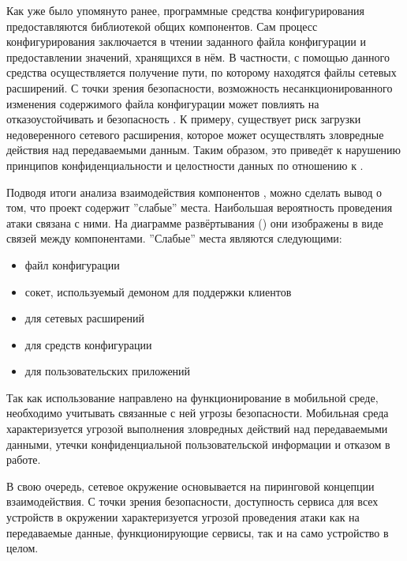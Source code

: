 %
Как уже было упомянуто ранее, программные средства конфигурирования \PeerHood предоставляются библиотекой общих компонентов. 
%
Сам процесс конфигурирования заключается в чтении заданного файла конфигурации и предоставлении значений, хранящихся в нём. 
%
В частности, с помощью данного средства осуществляется получение пути, по которому находятся файлы сетевых расширений. 
%
С точки зрения безопасности, возможность несанкционированного изменения содержимого файла конфигурации может повлиять на отказоустойчивать и безопасность \PeerHood. 
%
К примеру, существует риск загрузки недоверенного сетевого расширения, которое может осуществлять зловредные действия над передаваемыми данным.
%
Таким образом, это приведёт к нарушению принципов конфиденциальности и целостности данных по отношению к \PeerHood. 

%
Подводя итоги анализа взаимодействия компонентов \PeerHood, можно сделать вывод о том, что проект содержит ''слабые'' места. Наибольшая вероятность проведения атаки связана с ними. На диаграмме развёртывания \PeerHood () они изображены в виде связей между компонентами. ''Слабые'' места \PeerHood являются следующими:
\begin{itemize}
	\setlength{\itemsep}{0pt}%

	\item файл конфигурации
	\item сокет, используемый демоном для поддержки клиентов
	\item {} для сетевых расширений
	\item {} для средств конфигурации
	\item {} для пользовательских приложений
\end{itemize}

%
Так как использование \PeerHood направлено на функционирование в мобильной среде, необходимо учитывать связанные с ней угрозы безопасности. 
%
Мобильная среда характеризуется угрозой выполнения зловредных действий над передаваемыми данными, утечки конфиденциальной пользовательской информации и отказом  в работе. 

%
В свою очередь, сетевое окружение \PeerHood основывается на пиринговой концепции взаимодействия. 
%
С точки зрения безопасности, доступность сервиса для всех устройств в окружении характеризуется угрозой проведения атаки как на передаваемые данные, функционирующие сервисы, так и на само устройство в целом. 

